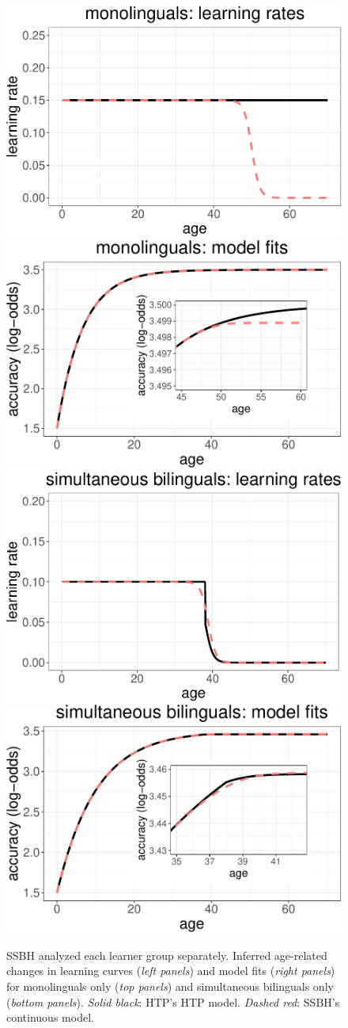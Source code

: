 \documentclass[
  english,
  doc,floatsintext]{apa6}
\begin{document}
\begin{figure}
\includegraphics[width=0.48\linewidth]{SlikResponse_rmd_files/figure-latex/natives-1} \includegraphics[width=0.48\linewidth]{SlikResponse_rmd_files/figure-latex/natives-2} \includegraphics[width=0.48\linewidth]{SlikResponse_rmd_files/figure-latex/natives-3} \includegraphics[width=0.48\linewidth]{SlikResponse_rmd_files/figure-latex/natives-4} \caption{SSBH analyzed each learner group separately. Inferred age-related changes in learning curves (\emph{left panels}) and model fits (\emph{right panels}) for monolinguals only (\emph{top panels}) and simultaneous bilinguals only (\emph{bottom panels}). \emph{Solid black}: HTP's HTP model. \emph{Dashed red}: SSBH's continuous model.}\label{fig:natives}
\end{figure}
\end{document}
